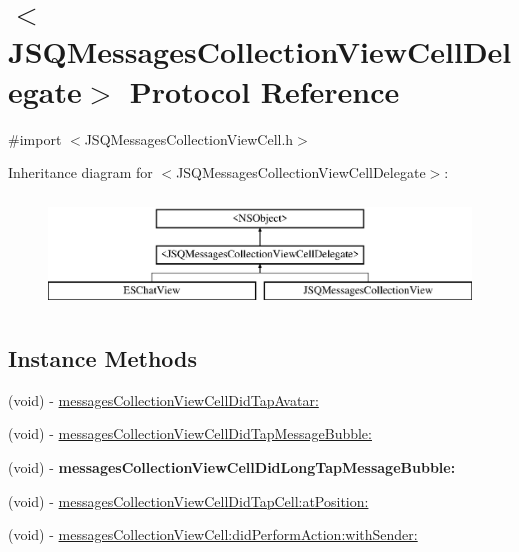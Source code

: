 \hypertarget{protocol_j_s_q_messages_collection_view_cell_delegate-p}{}\section{$<$J\+S\+Q\+Messages\+Collection\+View\+Cell\+Delegate$>$ Protocol Reference}
\label{protocol_j_s_q_messages_collection_view_cell_delegate-p}


{\ttfamily \#import $<$J\+S\+Q\+Messages\+Collection\+View\+Cell.\+h$>$}

Inheritance diagram for $<$J\+S\+Q\+Messages\+Collection\+View\+Cell\+Delegate$>$\+:\begin{figure}[H]
\begin{center}
\leavevmode
\includegraphics[height=3.000000cm]{protocol_j_s_q_messages_collection_view_cell_delegate-p}
\end{center}
\end{figure}
\subsection*{Instance Methods}
\begin{DoxyCompactItemize}
\item 
(void) -\/ \hyperlink{protocol_j_s_q_messages_collection_view_cell_delegate-p_a54dcedb0f479ac45dd31aeb1fd3c8661}{messages\+Collection\+View\+Cell\+Did\+Tap\+Avatar\+:}
\item 
(void) -\/ \hyperlink{protocol_j_s_q_messages_collection_view_cell_delegate-p_aff82621da6c6ab5227b78b74c801d841}{messages\+Collection\+View\+Cell\+Did\+Tap\+Message\+Bubble\+:}
\item 
\hypertarget{protocol_j_s_q_messages_collection_view_cell_delegate-p_a9c3a1399d7b1ac4f7d85c7fe7abc1c94}{}(void) -\/ {\bfseries messages\+Collection\+View\+Cell\+Did\+Long\+Tap\+Message\+Bubble\+:}\label{protocol_j_s_q_messages_collection_view_cell_delegate-p_a9c3a1399d7b1ac4f7d85c7fe7abc1c94}

\item 
(void) -\/ \hyperlink{protocol_j_s_q_messages_collection_view_cell_delegate-p_abebf370fdbb10bd6a7b3b0cad1258c48}{messages\+Collection\+View\+Cell\+Did\+Tap\+Cell\+:at\+Position\+:}
\item 
(void) -\/ \hyperlink{protocol_j_s_q_messages_collection_view_cell_delegate-p_a383c9dc3be621e5fae1dcdae8d7d165d}{messages\+Collection\+View\+Cell\+:did\+Perform\+Action\+:with\+Sender\+:}
\end{DoxyCompactItemize}



